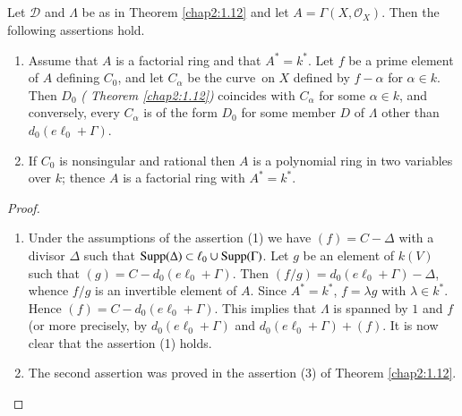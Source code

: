\subsection{}\label{chap2:1.13}
\begin{lemma*}
  Let $\mathscr{D}$ and $\Lambda$ be as in Theorem \ref{chap2:1.12} and let
  $A=\Gamma(X,\mathscr{O}_{X})$. Then the following assertions hold.
  \begin{enumerate}
    \renewcommand{\labelenumi}{\rm(\theenumi)}
  \item Assume that $A$ is a factorial ring and that
    $A^{\ast}=k^{\ast}$. Let $f$ be a prime element of $A$ defining
    $C_{0}$, and let $C_{\alpha}$ be the curve\pageoriginale\ on $X$
    defined by $f-\alpha$ for $\alpha\in k$. Then $D_{0}$ {\em (\cf
      Theorem \ref{chap2:1.12})} coincides with $C_{\alpha}$ for some
    $\alpha\in k$, and conversely, every $C_{\alpha}$ is of the form
    $D_{0}$ for some member $D$ of $\Lambda$ other than
    $d_{0}(e\ell_{0}+\Gamma)$. 
    
  \item If $C_{0}$ is nonsingular and rational then $A$ is a polynomial
    ring in two variables over $k$; thence $A$ is a factorial ring with
    $A^{\ast}=k^{\ast}$. 
  \end{enumerate}
\end{lemma*}

\begin{proof}
\begin{enumerate}
\renewcommand{\labelenumi}{(\theenumi)}
\item Under the assumptions of the assertion (1) we have
  $(f)=C-\Delta$ with a divisor $\Delta$ such that
  $\operatorname{Supp}(\Delta)\subset \ell_{0}\cup \operatorname{Supp}(\Gamma)$. Let $g$ be an
  element of $k(V)$ such that $(g)=C-d_{0}(e\ell_{0}+\Gamma)$. Then
  $(f/g)=d_{0}(e\ell_{0}+\Gamma)-\Delta$, whence $f/g$ is an
  invertible element of $A$. Since $A^{\ast}=k^{\ast}$, $f=\lambda g$
  with $\lambda\in k^{\ast}$. Hence
  $(f)=C-d_{0}(e\ell_{0}+\Gamma)$. This implies that $\Lambda$ is
  spanned by $1$ and $f$ (or more precisely, by
  $d_{0}(e\ell_{0}+\Gamma)$ and $d_{0}(e\ell_{0}+\Gamma)+(f)$. It is
  now clear that the assertion (1) holds.

\item The second assertion was proved in the assertion (3) of Theorem
  \ref{chap2:1.12}.
\end{enumerate}
\end{proof}


